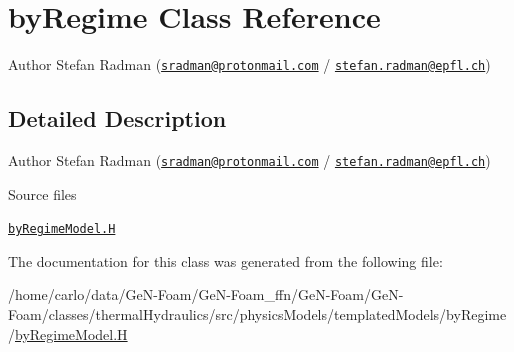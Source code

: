 \hypertarget{classFoam_1_1byRegime}{}\section{by\+Regime Class Reference}
\label{classFoam_1_1byRegime}


Author Stefan Radman (\href{mailto:sradman@protonmail.com}{\tt sradman@protonmail.\+com} / \href{mailto:stefan.radman@epfl.ch}{\tt stefan.\+radman@epfl.\+ch})  




\subsection{Detailed Description}
Author Stefan Radman (\href{mailto:sradman@protonmail.com}{\tt sradman@protonmail.\+com} / \href{mailto:stefan.radman@epfl.ch}{\tt stefan.\+radman@epfl.\+ch}) 

\label{_Description}%
 \begin{DoxyParagraph}{Source files}

\begin{DoxyItemize}
\item \href{../../../home/carlo/data/GeN-Foam/GeN-Foam_ffn/GeN-Foam/GeN-Foam/classes/thermalHydraulics/src/physicsModels/templatedModels/byRegime/byRegimeModel.H}{\tt by\+Regime\+Model.\+H} 
\end{DoxyItemize}
\end{DoxyParagraph}


The documentation for this class was generated from the following file\+:\begin{DoxyCompactItemize}
\item 
/home/carlo/data/\+Ge\+N-\/\+Foam/\+Ge\+N-\/\+Foam\+\_\+ffn/\+Ge\+N-\/\+Foam/\+Ge\+N-\/\+Foam/classes/thermal\+Hydraulics/src/physics\+Models/templated\+Models/by\+Regime/\hyperlink{byRegimeModel_8H}{by\+Regime\+Model.\+H}\end{DoxyCompactItemize}
